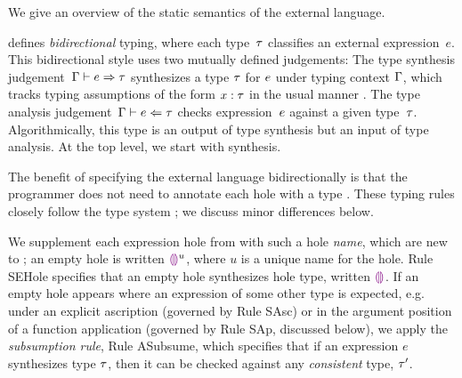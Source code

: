 
%
%
%





We give an overview of the static semantics of the \HazelnutLive
external language.

 defines \emph{bidirectional} typing,
where each type~$\tau$ classifies an external expression~$e$.
%
This bidirectional style uses two mutually defined judgements: The type synthesis
judgement~$\Gamma \vdash e \Rightarrow \tau$ synthesizes a type $\tau$
for $e$ under typing context $\Gamma$, which tracks typing
assumptions of the form $x : \tau$ in the usual
manner \cite{pfpl,tapl}.
%
The type analysis judgement~$\Gamma \vdash e \Leftarrow \tau$ checks
expression~$e$ against a given type~$\tau$. Algorithmically, this
type is an output of type synthesis but an input of type analysis. At
the top level, we start with synthesis.


The benefit of specifying the \HazelnutLive external language
bidirectionally is that the programmer does not need to annotate each
hole with a type
%
\cite{Pierce:2000ve,bidi-tutorial,DBLP:conf/icfp/DunfieldK13,Chlipala:2005da}.
%
These typing rules closely follow the \Hazelnut type
system \cite{popl-paper}; we discuss minor differences below.

We supplement each expression hole from \Hazelnut with such a
hole \emph{name}, which are new to \HazelnutLive; an empty hole is
written $\textcolor{violet}{\llparenthesis}\textcolor{violet}{\rrparenthesis}^{u}$, where $u$ is a unique name for the hole.
%
Rule {SEHole} specifies that an empty hole synthesizes hole type, written $\textcolor{violet}{\llparenthesis}\textcolor{violet}{\rrparenthesis}$.
%
If an empty hole appears where an expression of some other type is
expected, e.g. under an explicit ascription (governed by Rule {SAsc})
or in the argument position of a function application (governed by
Rule {SAp}, discussed below), we apply the \emph{subsumption rule},
Rule {ASubsume}, which specifies that if an expression $e$ synthesizes
type $\tau$, then it can be checked against any \emph{consistent}
type, $\tau'$.

